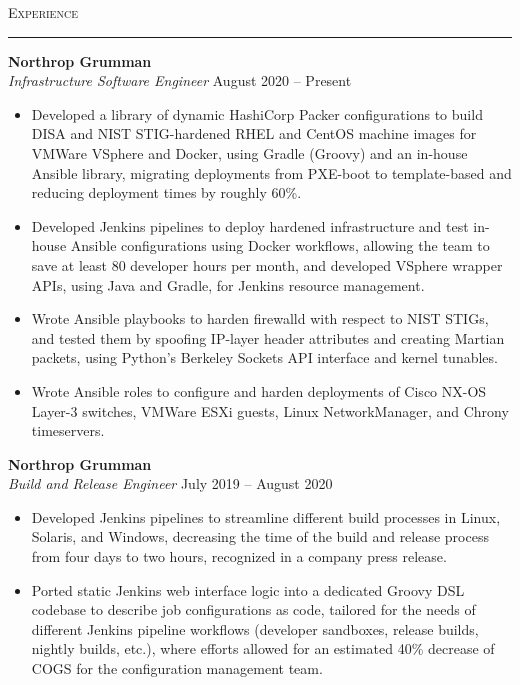 \documentclass{res}
\begin{document}
\begin{resume}
\textsc{{\Large Experience}}
\vspace{0.5mm}
\hrule width18.5cm
\textbf{Northrop Grumman}\\
\textit{Infrastructure Software Engineer}
\hfill
August 2020 -- Present\\[1mm]
	\begin{itemize}
		\vspace{-3mm}
  \item Developed a library of dynamic HashiCorp Packer configurations to build DISA and NIST STIG-hardened RHEL and CentOS machine images for VMWare VSphere and Docker, using Gradle (Groovy) and an in-house Ansible library, migrating deployments from PXE-boot to template-based and reducing deployment times by roughly 60\%.
    \item Developed Jenkins pipelines to deploy hardened infrastructure and test in-house Ansible configurations using Docker workflows, allowing the team to save at least 80 developer hours per month, and developed VSphere wrapper APIs, using Java and Gradle, for Jenkins resource management.
    \item Wrote Ansible playbooks to harden firewalld with respect to NIST STIGs, and tested them by spoofing IP-layer header attributes and creating Martian packets, using Python's Berkeley Sockets API interface and kernel tunables.
    \item Wrote Ansible roles to configure and harden deployments of Cisco NX-OS Layer-3 switches, VMWare ESXi guests, Linux NetworkManager, and Chrony timeservers.
  \end{itemize}
\textbf{Northrop Grumman}\\
\textit{Build and Release Engineer}
\hfill
July 2019 -- August 2020\\[1mm]
	\begin{itemize}
		\vspace{-3mm}
    \item Developed Jenkins pipelines to streamline different build processes in Linux, Solaris, and Windows, decreasing the time of the build and release process from four days to two hours, recognized in a company press release.
    \item Ported static Jenkins web interface logic into a dedicated Groovy DSL codebase to describe job configurations as code, tailored for the needs of different Jenkins pipeline workflows (developer sandboxes, release builds, nightly builds, etc.), where efforts allowed for an estimated 40\% decrease of COGS for the configuration management team.

\end{itemize}
\end{resume}
\end{document}
